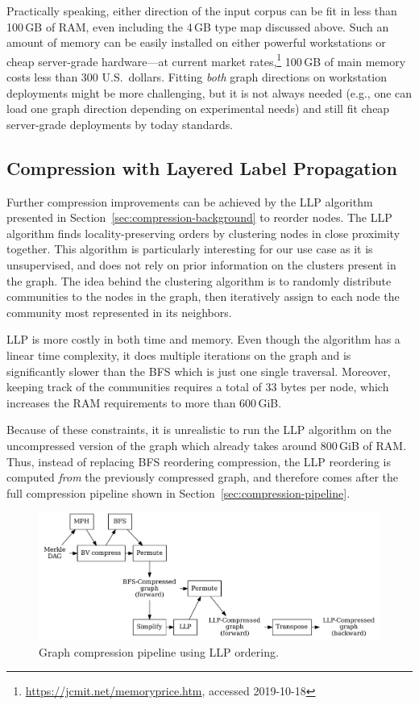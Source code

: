 Practically speaking, either direction of the input corpus can be fit in less
than 100\,GB of RAM, even including the 4\,GB type map discussed above. Such an
amount of memory can be easily installed on either powerful workstations or
cheap server-grade hardware---at current market
rates,\footnote{\url{https://jcmit.net/memoryprice.htm}, accessed 2019-10-18}
100\,GB of main memory costs less than 300 U.S.~dollars. Fitting \emph{both}
graph directions on workstation deployments might be more challenging, but it
is not always needed (e.g., one can load one graph direction depending on
experimental needs) and still fit cheap server-grade deployments by today
standards.

\subsection{Compression with Layered Label Propagation}%
\label{sec:llp-compression}

Further compression improvements can be achieved by the \acrfull{LLP}
algorithm~\cite{BRSLLP} presented in Section~\ref{sec:compression-background}
to reorder nodes. The \gls{LLP} algorithm finds locality-preserving orders by
clustering nodes in close proximity together.  This algorithm is particularly
interesting for our use case as it is unsupervised, and does not rely on prior
information on the clusters present in the graph. The idea behind the
clustering algorithm is to randomly distribute communities to the nodes in the
graph, then iteratively assign to each node the community most represented in
its neighbors.

\gls{LLP} is more costly in both time and memory. Even though the algorithm has
a linear time complexity, it does multiple iterations on the graph and is
significantly slower than the \gls{BFS} which is just one single traversal.
Moreover, keeping track of the communities requires a total of 33 bytes per
node, which increases the RAM requirements to more than 600\,GiB.

Because of these constraints, it is unrealistic to run the \gls{LLP} algorithm
on the uncompressed version of the graph which already takes around 800\,GiB of
RAM. Thus, instead of replacing \gls{BFS} reordering compression, the \gls{LLP}
reordering is computed \emph{from} the previously compressed graph, and
therefore comes after the full compression pipeline shown in
Section~\ref{sec:compression-pipeline}.

\begin{figure}
  \centering
  \includegraphics[width=\linewidth]{img/compression/compression_steps_llp}
    \caption{Graph compression pipeline using \gls{LLP} ordering.}%
  \label{fig:llp-compression-pipeline}
\end{figure}

